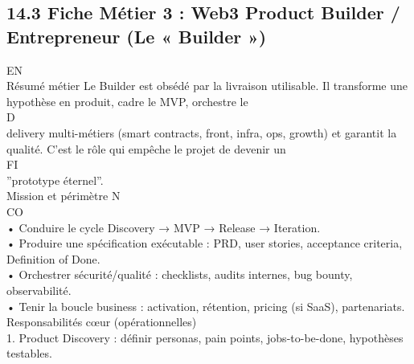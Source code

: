 \documentclass[12pt,landscape,a4paper]{article}
\begin{document}
\subsection{14.3 Fiche Métier 3 : Web3 Product Builder / Entrepreneur (Le « Builder »)}
\vspace{0.5em}
\vspace{0.5em}
\vspace{0.5em}
\vspace{0.5em}
EN\\
Résumé métier Le Builder est obsédé par la livraison utilisable. Il transforme une hypothèse en produit, cadre le MVP, orchestre le\\
\vspace{0.5em}
\vspace{0.5em}
\vspace{0.5em}
\vspace{0.5em}
D\\
delivery multi-métiers (smart contracts, front, infra, ops, growth) et garantit la qualité. C’est le rôle qui empêche le projet de devenir un\\
\vspace{0.5em}
\vspace{0.5em}
\vspace{0.5em}
\vspace{0.5em}
FI\\
”prototype éternel”.\\
\vspace{0.5em}
Mission et périmètre                                N\\
CO\\
• Conduire le cycle Discovery → MVP → Release → Iteration.\\
\vspace{0.5em}
• Produire une spécification exécutable : PRD, user stories, acceptance criteria, Definition of Done.\\
\vspace{0.5em}
• Orchestrer sécurité/qualité : checklists, audits internes, bug bounty, observabilité.\\
\vspace{0.5em}
• Tenir la boucle business : activation, rétention, pricing (si SaaS), partenariats.\\
\vspace{0.5em}
Responsabilités cœur (opérationnelles)\\
\vspace{0.5em}
1. Product Discovery : définir personas, pain points, jobs-to-be-done, hypothèses testables.\\
\end{document}
